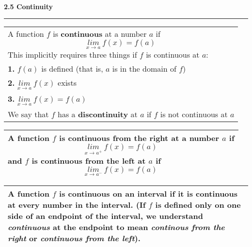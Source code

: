 \documentclass[fleqn]{article}
\begin{document}
\begin{center}
\Large\textbf{2.5 Continuity}

\noindent\hfill\rule{0.3\textwidth}{.4pt}\hfill
\vspace{12pt}

\large
\def\arraystretch{1.3}
{\setlength{\tabcolsep}{16pt}
\begin{tabularx}{.9\textwidth}{|X|}
\hline
	\vspace{1pt}
	A function $f$ is \textbf{continuous} at a number $a$ if
	$$\underset{x \to a}{lim} \: f(x) = f(a)$$ 
	This implicitly requires three things if $f$ is continuous at $a$: \\
	\textbf{1. } $f(a)$ is defined (that is, $a$ is in the domain of $f$) \\
	\textbf{2. } $\underset{x \to a}{lim} \: f(x)$ exists \\
	\textbf{3. } $\underset{x \to a}{lim} \: f(x) = f(a)$ \\[12pt]
	We say that $f$ has a \textbf{discontinuity} at $a$ if $f$ is not continuous at $a$ \\[16pt]
\hline
\end{tabularx}}
\vspace{12pt}

\def\arraystretch{1.3}
{\setlength{\tabcolsep}{16pt}
\begin{tabularx}{.9\textwidth}{|X|}
\hline
	\vspace{1pt}
	A function $f$ is \textbf{continuous from the right} at a number $a$ if 
	$$\underset{x \to a^+}{lim} \: f(x) = f(a)$$
	and $f$ is \textbf{continuous from the left} at $a$ if
	$$\underset{x \to a^-}{lim} \: f(x) = f(a)$$ \\
\hline
\end{tabularx}}
\vspace{12pt}

\def\arraystretch{1.3}
{\setlength{\tabcolsep}{16pt}
\begin{tabularx}{.9\textwidth}{|X|}
\hline
	\vspace{1pt}
	A function $f$ is \textbf{continuous on an interval} if it is continuous at every  number in the interval. (If $f$ is defined only on one side of an endpoint of the interval, we understand \textit{continuous} at the endpoint to mean \textit{continous from the right} or \textit{continuous from the left}). \\[16pt]
\hline
\end{tabularx}}
\vspace{12pt}


\end{center}
\end{document}
